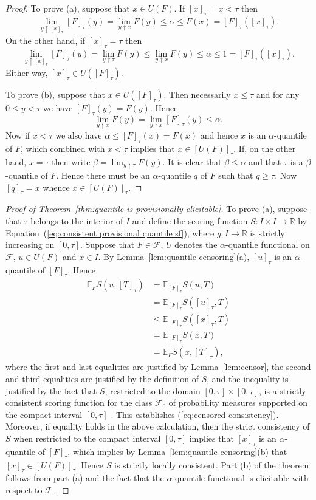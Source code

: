 \documentclass[10pt]{article} %
\theoremstyle{theorem}
\theoremstyle{definition}
\newcommand{\RRR}{\mathbb{R}}
\newcommand{\EEE}{\mathbb{E}}
\begin{document}
\begin{proof}
To prove (a), suppose that $x\in U(F)$. If $[x]_\tau = x < \tau$ then
\[\lim_{y\uparrow [x]_\tau} [F]_\tau(y) = \lim_{y\uparrow x} F(y) \leq \alpha \leq F(x) = [F]_\tau([x]_\tau).\]
On the other hand, if $[x]_\tau = \tau$ then
\[\lim_{y\uparrow [x]_\tau} [F]_\tau(y) = \lim_{y\uparrow \tau} F(y) \leq \lim_{y\uparrow x} F(y) \leq \alpha \leq 1 =  [F]_\tau([x]_\tau).\]
Either way, $[x]_\tau \in U([F]_\tau)$.

To prove (b), suppose that $x\in U([F]_\tau)$. Then necessarily $x\leq \tau$ and for any $0\leq y<\tau$ we have $[F]_\tau(y)=F(y)$. Hence
\[ \lim_{y\uparrow x}F(y) = \lim_{y\uparrow x}[F]_\tau(y)\leq \alpha.\]
Now if $x<\tau$ we also have $\alpha \leq [F]_\tau(x)=F(x)$ and hence $x$ is an $\alpha$-quantile of $F$, which combined with $x<\tau$ implies that $x\in[U(F)]_\tau$. If, on the other hand, $x=\tau$ then write $\beta=\lim_{y\uparrow \tau}F(y)$. It is clear that $\beta \leq \alpha$ and that $\tau$ is a $\beta$-quantile of $F$. Hence there must be an $\alpha$-quantile $q$ of $F$ such that $q\geq\tau$. Now $[q]_\tau= x$ whence $x\in[U(F)]_\tau$.
\end{proof}

\begin{proof}[Proof of Theorem~\ref{thm:quantile is provisionally elicitable}]
To prove (a), suppose that $\tau$ belongs to the interior of $I$ and define the scoring function $S: I \times I\to\RRR$ by Equation~(\ref{eq:consistent provisional quantile sf}), where $g:I\to\RRR$ is strictly increasing on $[0,\tau]$. Suppose that $F\in\mathcal{F}$, $U$ denotes the $\alpha$-quantile functional on $\mathcal{F}$, $u\in U(F)$ and $x\in I$. By Lemma~\ref{lem:quantile censoring}(a), $[u]_\tau$ is an $\alpha$-quantile of $[F]_\tau$. Hence
\begin{align*}
\EEE_F S(u,[T]_\tau)
&= \EEE_{[F]_\tau} S(u,T) \\
&= \EEE_{[F]_\tau} S([u]_\tau,T) \\
&\leq  \EEE_{[F]_\tau} S([x]_\tau,T) \\
&= \EEE_{[F]_\tau} S(x,T) \\
&= \EEE_F S(x,[T]_\tau),
\end{align*}
where the first and last equalities are justified by Lemma~\ref{lem:censor}, the second and third equalities are justified by the definition of $S$, and the inequality is justified by the fact that $S$, restricted to the domain $[0,\tau]\times[0,\tau]$, is a strictly consistent scoring function for the class $\mathcal{F}_0$ of probability measures supported on the compact interval $[0,\tau]$ \citep{gneiting2011quantiles}. This establishes (\ref{eq:censored consistency}). Moreover, if equality holds in the above calculation, then the strict consistency of $S$ when restricted to the compact interval $[0,\tau]$ implies that $[x]_\tau$ is an $\alpha$-quantile of $[F]_\tau$, which implies by Lemma~\ref{lem:quantile censoring}(b) that $[x]_\tau\in [U(F)]_\tau$. Hence $S$ is strictly locally consistent. Part (b) of the theorem follows from part (a) and the fact that the $\alpha$-quantile functional is elicitable with respect to $\mathcal{F}$ \citep[Theorem~9]{gneiting2011making}.
\end{proof}
\end{document}
